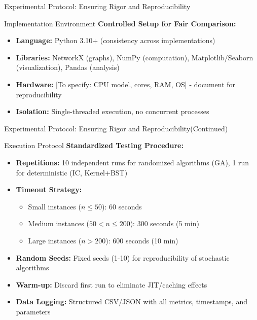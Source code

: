 \documentclass[aspectratio=169]{beamer}
\begin{document}
\begin{frame}{Experimental Protocol: Ensuring Rigor and Reproducibility}
	\begin{block}{Implementation Environment}
		\textbf{Controlled Setup for Fair Comparison:}
		\begin{itemize}
			\item \textbf{Language:} Python 3.10+ (consistency across implementations)
			\item \textbf{Libraries:} NetworkX (graphs), NumPy (computation), Matplotlib/Seaborn (visualization), Pandas (analysis)
			\item \textbf{Hardware:} [To specify: CPU model, cores, RAM, OS] - document for reproducibility
			\item \textbf{Isolation:} Single-threaded execution, no concurrent processes
		\end{itemize}
	\end{block}


	
\end{frame}

\begin{frame}{Experimental Protocol: Ensuring Rigor and Reproducibility(Continued)}
\begin{block}{Execution Protocol}
		\textbf{Standardized Testing Procedure:}
		\begin{itemize}
			\item \textbf{Repetitions:} 10 independent runs for randomized algorithms (GA), 1 run for deterministic (IC, Kernel+BST)
			\item \textbf{Timeout Strategy:}
			      \begin{itemize}
				      \scriptsize
				      \item Small instances ($n \leq 50$): 60 seconds
				      \item Medium instances ($50 < n \leq 200$): 300 seconds (5 min)
				      \item Large instances ($n > 200$): 600 seconds (10 min)
			      \end{itemize}
			\item \textbf{Random Seeds:} Fixed seeds (1-10) for reproducibility of stochastic algorithms
			\item \textbf{Warm-up:} Discard first run to eliminate JIT/caching effects
			\item \textbf{Data Logging:} Structured CSV/JSON with all metrics, timestamps, and parameters
		\end{itemize}
	\end{block}
	
\end{frame}
\end{document}
